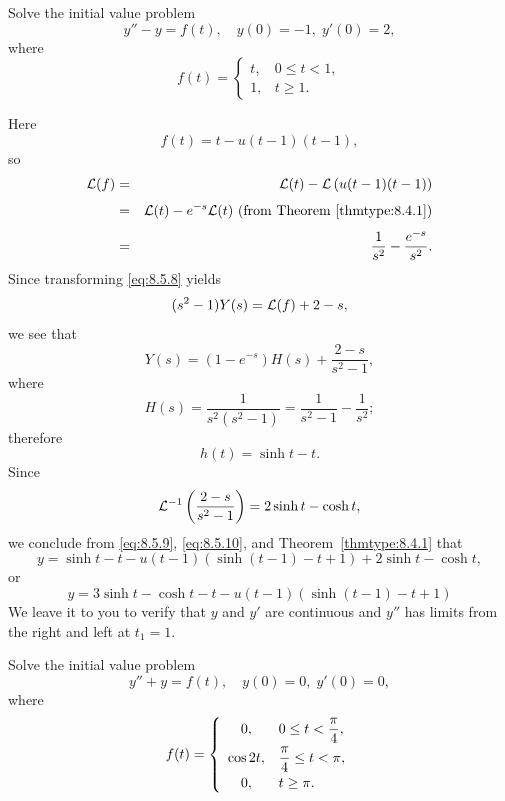 \begin{example}
  \label{example:8.5.3}\rm \space Solve the initial value problem
  \begin{equation}
    \label{eq:8.5.8}y''-y=f(t),\quad y(0)=-1,\;y'(0)=2,
  \end{equation}
  where
  \[
    f(t)=\left\{
    \begin{array}{cl}
      t, & 0\le t<1, \\
      1, & t\ge1.
    \end{array}\right.
  \]
\end{example}

\begin{examplesolution}
\solution Here
\[
  f(t)=t-u(t-1)(t-1),
\]
so
\begin{eqnarray*}
  {\cal L}(f) & = & {\cal L}(t)-{\cal L}\left(u(t-1)(t-1)\right)                            \\[1\jot]
              & = & {\cal L}(t)-e^{-s}{\cal L}(t)\mbox{ (from Theorem~\ref{thmtype:8.4.1})} \\[1\jot]
              & = & \frac{1}{s^{2}}-\frac{e^{-s}}{s^{2}}.
\end{eqnarray*}
Since transforming \eqref{eq:8.5.8} yields
\[
  (s^{2}-1)Y(s)={\cal L}(f)+2-s,
\]
we see that
\begin{equation}
  \label{eq:8.5.9}Y(s)=(1-e^{-s})H(s)+\frac{2-s}{s^{2}-1},
\end{equation}
where
\[
  H(s)=\frac{1}{s^{2}(s^{2}-1)}=\frac{1}{s^{2}-1}-\frac{1}{s^{2}};
\]
therefore
\begin{equation}
  \label{eq:8.5.10}h(t)=\sinh t-t.
\end{equation}
Since
\[
  {\cal L}^{-1}\left(\frac{2-s}{s^{2}-1}\right)=2\sinh t-\cosh t,
\]
we conclude from \eqref{eq:8.5.9}, \eqref{eq:8.5.10}, and Theorem~\ref{thmtype:8.4.1} that
\[
  y=\sinh t-t-u(t-1)\left(\sinh(t-1)-t+1\right)+2\sinh t- \cosh t,
\]
or
\begin{equation}
  \label{eq:8.5.11}y=3\sinh t-\cosh t-t-u(t-1)\left(\sinh(t-1)-t+1\right)
\end{equation}
We leave it to you to verify that $y$ and $y'$ are continuous and $y''$ has limits from the right
and left at $t_{1}=1$.
\end{examplesolution}

\begin{example}
  \label{example:8.5.4}\rm Solve the initial value problem
  \begin{equation}
    \label{eq:8.5.12}y''+y=f(t),\quad y(0)=0,\;y'(0)=0,
  \end{equation}
  where
  \[
    f(t)=\left\{
    \begin{array}{cl}
      0,      & 0\le t<\displaystyle{\frac{\pi}{4}},   \\[2\jot]
      \cos2t, & \displaystyle{\frac{\pi}{4}}\le t<\pi, \\[2\jot]
      0,      & t\ge\pi.
    \end{array}\right.
  \]
\end{example}

